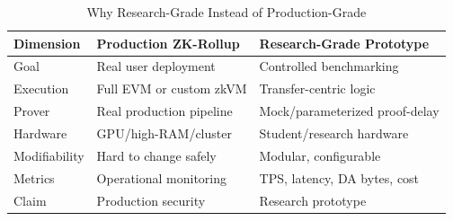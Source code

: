 \begin{table}[H]
\centering
\caption{Why Research-Grade Instead of Production-Grade}
\label{tab:research_grade_vs_production_grade}
\begin{tabular}{|l|p{4cm}|p{4cm}|}
\hline
\textbf{Dimension} & \textbf{Production ZK-Rollup} & \textbf{Research-Grade Prototype} \\ \hline
Goal & Real user deployment & Controlled benchmarking \\ \hline
Execution & Full EVM or custom zkVM & Transfer-centric logic \\ \hline
Prover & Real production pipeline & Mock/parameterized proof-delay \\ \hline
Hardware & GPU/high-RAM/cluster & Student/research hardware \\ \hline
Modifiability & Hard to change safely & Modular, configurable \\ \hline
Metrics & Operational monitoring & TPS, latency, DA bytes, cost \\ \hline
Claim & Production security & Research prototype \\ \hline
\end{tabular}
\end{table}
